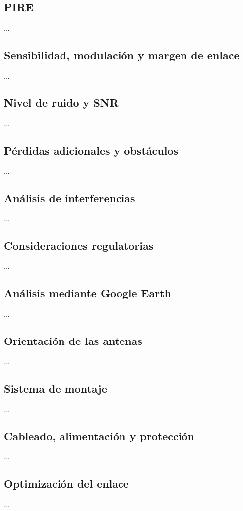 \subsection{PIRE}
\label{sec_2.12}
...



\subsection{Sensibilidad, modulación y margen de enlace}
\label{sec_2.13}
...



\subsection{Nivel de ruido y SNR}
\label{sec_2.14}
...



\subsection{Pérdidas adicionales y obstáculos}
\label{sec_2.15}
...



\subsection{Análisis de interferencias}
\label{sec_2.16}
...



\subsection{Consideraciones regulatorias}
\label{sec_2.17}
...



\subsection{Análisis mediante Google Earth}
\label{sec_2.18}
...



\subsection{Orientación de las antenas}
\label{sec_2.19}
...



\subsection{Sistema de montaje}
\label{sec_2.20}
...



\subsection{Cableado, alimentación y protección}
\label{sec_2.21}
...



\subsection{Optimización del enlace}
\label{sec_2.22}
...
